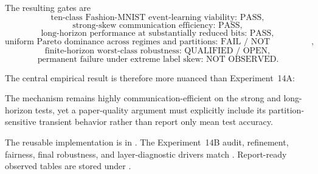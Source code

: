 The resulting gates are
\begin{equation}
\boxed{\text{ten-class Fashion-MNIST event-learning viability: PASS}},
\end{equation}
\begin{equation}
\boxed{\text{strong-skew communication efficiency: PASS}},
\end{equation}
\begin{equation}
\boxed{\text{long-horizon performance at substantially reduced bits: PASS}},
\end{equation}
\begin{equation}
\boxed{\text{uniform Pareto dominance across regimes and partitions: FAIL / NOT ESTABLISHED}},
\end{equation}
\begin{equation}
\boxed{\text{finite-horizon worst-class robustness: QUALIFIED / OPEN}},
\end{equation}
\begin{equation}
\boxed{\text{permanent failure under extreme label skew: NOT OBSERVED}}.
\end{equation}

The central empirical result is therefore more nuanced than Experiment~14A:
\begin{center}
\end{center}
The mechanism remains highly communication-efficient on the strong and long-horizon tests, yet a paper-quality argument must explicitly include its partition-sensitive transient behavior rather than report only mean test accuracy.

The reusable implementation is in
. The Experiment~14B
audit, refinement, fairness, final robustness, and layer-diagnostic drivers
match . Report-ready observed tables are stored under
.
